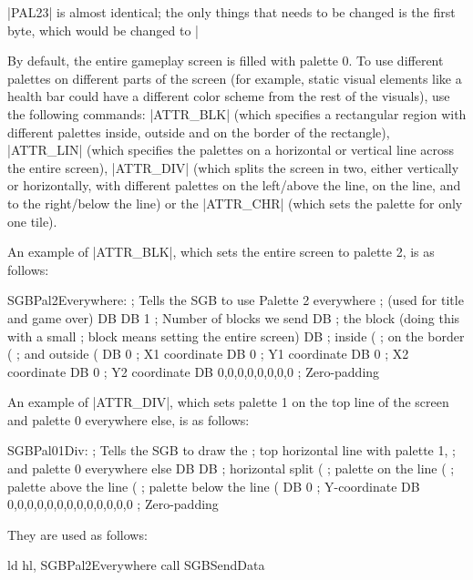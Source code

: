 \documentclass[11pt]{book}
\begin{document}
|PAL23| is almost identical; the only things that needs to be changed is the first byte, which would be changed to |%

By default, the entire gameplay screen is filled with palette 0. To use different palettes on different parts of the screen (for example, static visual elements like a health bar could have a different color scheme from the rest of the visuals), use the following commands: |ATTR_BLK| (which specifies a rectangular region with different palettes inside, outside and on the border of the rectangle), |ATTR_LIN| (which specifies the palettes on a horizontal or vertical line across the entire screen), |ATTR_DIV| (which splits the screen in two, either vertically or horizontally, with different palettes on the left/above the line, on the line, and to the right/below the line) or the |ATTR_CHR| (which sets the palette for only one tile). 

An example of |ATTR_BLK|, which sets the entire screen to palette 2, is as follows:

\begin{code}
SGBPal2Everywhere: ; Tells the SGB to use Palette 2 everywhere 
; (used for title and game over)
DB %
DB 1         ; Number of blocks we send
DB %
; the block (doing this with a small
; block means setting the entire screen)
DB %
; inside (%
; on the border (%
; and outside (%
DB 0         ; X1 coordinate
DB 0         ; Y1 coordinate
DB 0         ; X2 coordinate
DB 0         ; Y2 coordinate
DB 0,0,0,0,0,0,0,0 ; Zero-padding
\end{code}

An example of |ATTR_DIV|, which sets palette 1 on the top line of the screen and palette 0 everywhere else, is as follows: 

\begin{code}
SGBPal01Div: ; Tells the SGB to draw the 
; top horizontal line with palette 1,
; and palette 0 everywhere else 
DB %
DB %
; horizontal split (%
; palette on the line (%
; palette above the line (%
; palette below the line (%
DB 0         ; Y-coordinate
DB 0,0,0,0,0,0,0,0,0,0,0,0,0 ; Zero-padding
\end{code}

They are used as follows:

\begin{code}
ld hl, SGBPal2Everywhere
call SGBSendData
\end{code}
\end{document}

